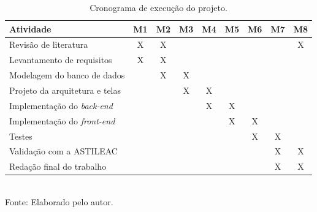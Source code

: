 \documentclass[
        oneside,      %
        english,			
        brazil			 
        ]{abntspiifac}
\begin{document}
\begin{table}[!htb]
\centering
\caption{Cronograma de execução do projeto.}
\label{tab:cronograma}
\footnotesize
\setlength{\tabcolsep}{4pt}
\renewcommand{\arraystretch}{1.3}
\begin{tabular}{p{5.2cm} *{8}{c}}
\toprule
\textbf{Atividade} & \textbf{M1} & \textbf{M2} & \textbf{M3} & \textbf{M4} & \textbf{M5} & \textbf{M6} & \textbf{M7} & \textbf{M8} \\
\midrule
Revisão de literatura              & X & X &   &   &   &   &   & X \\
Levantamento de requisitos         & X & X &   &   &   &   &   &   \\
Modelagem do banco de dados        &   & X & X &   &   &   &   &   \\
Projeto da arquitetura e telas     &   &   & X & X &   &   &   &   \\
Implementação do \textit{back-end} &   &   &   & X & X &   &   &   \\
Implementação do \textit{front-end} &   &   &   &   & X & X &   &   \\
Testes                             &   &   &   &   &   & X & X &   \\
Validação com a ASTILEAC           &   &   &   &   &   &   & X & X \\
Redação final do trabalho          &   &   &   &   &   &   & X & X \\
\bottomrule
\end{tabular}\\
{\footnotesize Fonte: Elaborado pelo autor.}
\end{table}



\postextual 



\end{document}
